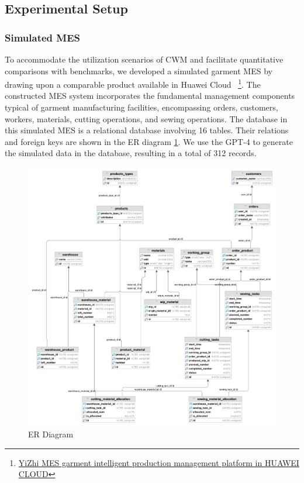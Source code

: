 \documentclass[preprint,12pt]{elsarticle}
\providecommand{\DIFaddbegin}{} %
\providecommand{\DIFaddend}{} %
\newcommand{\DIFaddincludegraphics}[2][]{{\color{blue}\fbox{\DIFOincludegraphics[#1]{#2}}}} %
\DeclareRobustCommand{\DIFaddbegin}{\DIFOaddbegin \let\includegraphics\DIFaddincludegraphics} %
\DeclareRobustCommand{\DIFaddend}{\DIFOaddend \let\includegraphics\DIFOincludegraphics} %
\begin{document}
\subsection{Experimental Setup}

\DIFaddbegin 

\DIFaddend \subsubsection{Simulated MES}
To accommodate the utilization scenarios of CWM and facilitate quantitative comparisons with benchmarks, we developed a simulated garment MES by drawing upon a comparable product available in Huawei Cloud
~\footnote{\href{https://marketplace.huaweicloud.com/contents/da115457-cf31-47e1-bcff-965e5469d360\#productid=00301-608119-0--0}{YiZhi MES garment intelligent production management platform in HUAWEI CLOUD}}.
The constructed MES system incorporates the fundamental management components typical of garment manufacturing facilities, encompassing orders, customers, workers, materials, cutting operations, and sewing operations. 
The database in this simulated MES is a relational database involving 16 tables.
Their relations and foreign keys are shown in the ER diagram \ref{fig:er_diagram}.
We use the GPT-4 to generate the simulated data in the database, resulting in a total of 312 records.
\begin{figure}
        \centering
        \includegraphics[width=1.1\linewidth]{figs/garment.png}
        \caption{ER Diagram}
        \label{fig:er_diagram}
\end{figure}
\end{document}
